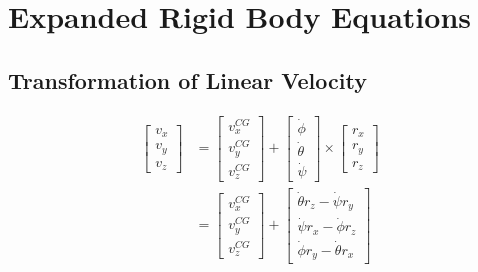 \chapter{Expanded Rigid Body Equations}
\section{Transformation of Linear Velocity}\label{sec:appendix-transformation-linvel}
\begin{align*}%
\begin{bmatrix}v_x \\ v_y \\ v_z\end{bmatrix}%
&=\begin{bmatrix}v_{x}^{CG} \\ v_{y}^{CG} \\ v_{z}^{CG}\end{bmatrix}%
+\begin{bmatrix}\dot{\phi} \\ \dot{\theta} \\ \dot{\psi}\end{bmatrix}\times\begin{bmatrix}r_x \\ r_y \\ r_z\end{bmatrix} \\%
&=\begin{bmatrix}v_{x}^{CG} \\ v_{y}^{CG} \\ v_{z}^{CG}\end{bmatrix}%
+\begin{bmatrix}\dot{\theta}r_z - \dot{\psi}r_y \\\dot{\psi}r_x - \dot{\phi}r_z \\\dot{\phi}r_y - \dot{\theta}r_x\end{bmatrix}%
\end{align*}

